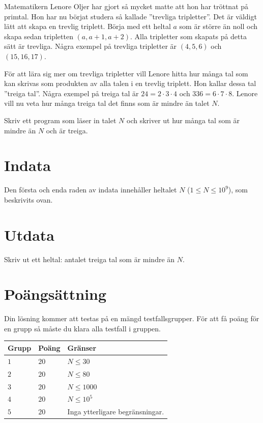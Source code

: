 \noindent

Matematikern Lenore Oljer har gjort så mycket matte att hon har tröttnat på primtal. 
Hon har nu börjat studera så kallade ''trevliga tripletter''. 
Det är väldigt lätt att skapa en trevlig triplett. 
Börja med ett heltal $a$ som är
större än noll och skapa sedan tripletten $(a,a+1,a+2)$. 
Alla tripletter som skapats på detta sätt är trevliga. 
Några exempel på trevliga tripletter är $(4,5,6)$ och $(15,16,17)$.

För att lära sig mer om trevliga tripletter vill Lenore hitta hur 
många tal som kan skrivas som produkten av
alla talen i en trevlig triplett. Hon kallar dessa tal ''treiga tal''. 
Några exempel på treiga tal är $24=2 \cdot 3 \cdot 4$
och $336 = 6 \cdot 7 \cdot 8$. Lenore vill nu veta hur många treiga tal det 
finns som är mindre än talet $N$.

Skriv ett program som läser in talet $N$ och skriver ut hur många tal som är mindre än
$N$ och är treiga.

\section*{Indata}
Den första och enda raden av indata innehåller heltalet $N$ ($1 \le N \le 10^9$), som beskrivits ovan.


\section*{Utdata}
Skriv ut ett heltal: antalet treiga tal som är mindre än $N$.


\section*{Poängsättning}
Din lösning kommer att testas på en mängd testfallsgrupper.
För att få poäng för en grupp så måste du klara alla testfall i gruppen.

\noindent
\begin{tabular}{| l | l | p{12cm} |}
  \hline
  \textbf{Grupp} & \textbf{Poäng} & \textbf{Gränser} \\ \hline
  $1$    & $20$       & $N \leq 30$ \\ \hline
  $2$    & $20$       & $N \leq 80$ \\ \hline
  $3$    & $20$       & $N \leq 1000$ \\ \hline
  $4$    & $20$       & $N \leq 10^5$ \\ \hline
  $5$    & $20$       & Inga ytterligare begränsningar. \\ \hline
\end{tabular}
